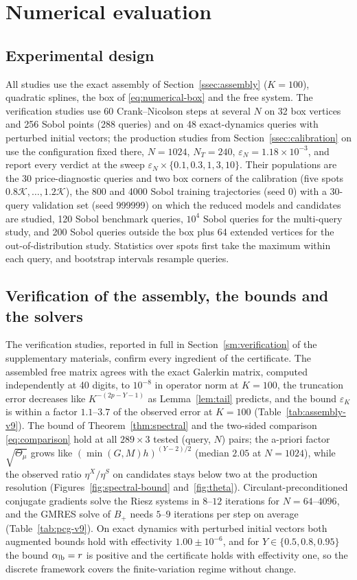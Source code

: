 \documentclass[hidelinks]{siamart251216}
\newcommand{\rf}{r}
\newcommand{\Thmu}{\Theta_\mu}
\begin{document}
\section{Numerical evaluation}
\label{sec:numerics}
\subsection{Experimental design}
\label{ssec:design}\label{tab:populations}
All studies use the exact assembly of Section~\ref{ssec:assembly} ($K=100$), quadratic splines,
the box of \eqref{eq:numerical-box} and the free system.  The verification studies use 60
Crank--Nicolson steps at several $N$ on 32 box vertices and 256 Sobol points (288 queries) and on 48
exact-dynamics queries with perturbed initial vectors; the production studies from
Section~\ref{ssec:calibration} on use the configuration fixed there, $N=1024$, $N_T=240$,
$\varepsilon_N=1.18\times10^{-3}$, and report every verdict at the sweep
$\varepsilon_N\times\{0.1,0.3,1,3,10\}$.  Their populations are the 30 price-diagnostic queries and
two box corners of the calibration (five spots $0.8\mathcal K,\dots,1.2\mathcal K$), the 800 and 4000
Sobol training trajectories (seed 0) with a 30-query validation set (seed 999999) on which the
reduced models and candidates are studied, 120 Sobol benchmark queries, $10^4$ Sobol queries for the
multi-query study, and 200 Sobol queries outside the box plus 64 extended vertices for the
out-of-distribution study.  Statistics over spots first take the maximum within each query, and
bootstrap intervals resample queries.
\subsection{Verification of the assembly, the bounds and the solvers}
\label{ssec:verification}\label{ssec:e0-assembly}\label{ssec:e0-spectral}\label{ssec:e0-riesz}\label{ssec:e0-initial}
The verification studies, reported in full in Section~\ref{sm:verification} of the supplementary
materials, confirm every ingredient of the certificate.  The assembled free matrix agrees with the
exact Galerkin matrix, computed independently at 40 digits, to $10^{-8}$ in operator norm at $K=100$,
the truncation error decreases like $K^{-(2p-Y-1)}$ as Lemma~\ref{lem:tail} predicts, and the bound
$\varepsilon_K$ is within a factor $1.1$--$3.7$ of the observed error at $K=100$
(Table~\ref{tab:assembly-v9}).  The bound of Theorem~\ref{thm:spectral} and the two-sided comparison
\eqref{eq:comparison} hold at all $289\times3$ tested (query, $N$) pairs; the a-priori factor
$\sqrt{\Thmu}$ grows like $(\min(G,M)h)^{(Y-2)/2}$ (median $2.05$ at $N=1024$), while the observed
ratio $\eta^X/\eta^S$ on candidates stays below two at the production resolution
(Figures~\ref{fig:spectral-bound} and~\ref{fig:theta}).  Circulant-preconditioned conjugate
gradients solve the Riesz systems in $8$--$12$ iterations for $N=64$--$4096$, and the GMRES solve of
$B_+$ needs $5$--$9$ iterations per step on average (Table~\ref{tab:pcg-v9}).  On exact dynamics with
perturbed initial vectors both augmented bounds hold with effectivity $1.00\pm10^{-6}$, and for
$Y\in\{0.5,0.8,0.95\}$ the bound $\alpha_{\rm lb}=\rf$ is positive and the certificate holds with
effectivity one, so the discrete framework covers the finite-variation regime without change.
\end{document}

